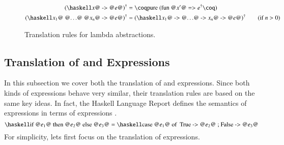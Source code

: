 \begin{figure}[H]
  \begin{align*}
    \toCoq{(\haskellM{\@$x$@ -> @$e$@})} &= \coqM{pure (fun @$x'$@ =>}\;\toCoq{e}\coqM{)} \\
    \toCoq{(\haskellM{\@$x_1$@ @$\ldots$@ @$x_n$@ -> @$e$@})} &= \toCoq{(\haskellM{\@$x_1$@ -> @$\ldots$@ -> \@$x_n$@ -> @$e$@})}
    \tag{if $n > 0$}
  \end{align*}
  \caption{Translation rules for lambda abstractions.}
  \label{fig:translation:expr:lambda}
\end{figure}

\subsection{Translation of  and  Expressions}
In this subsection we cover both the translation of  and  expressions.
Since both kinds of expressions behave very similar, their translation rules are based on the same key ideas.
In fact, the Haskell Language Report defines the semantics of  expressions in terms of  expressions \cite[p.~20]{Marlow:2010}.
\[
  \haskellM{if @$e_1$@ then @$e_2$@ else @$e_3$@}
    = \haskellM{case @$e_1$@ of { True -> @$e_2$@ ; False -> @$e_3$@ }}
\]
For simplicity, lets first focus on the translation of  expressions.

